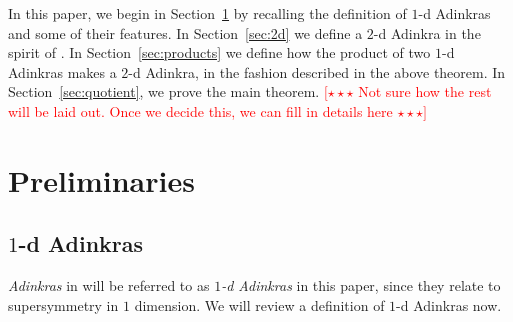\documentclass[12pt,twoside,singlespace]{article}
\numberwithin{equation}{section}
\theoremstyle{definition}
\newcommand{\com}[1]{\textcolor{red}{$[\star \star \star$ #1 $\star \star \star]$}}
\begin{document}
In this paper, we begin in Section~\ref{sec:prelim} by recalling the definition of $1$-d Adinkras and some of their features.  In Section~\ref{sec:2d} we define a $2$-d Adinkra in the spirit of \cite{gates:dimensional_extension,hubsch:weaving}.  In Section~\ref{sec:products} we define how the product of two $1$-d Adinkras makes a $2$-d Adinkra, in the fashion described in the above theorem.  In Section~\ref{sec:quotient}, we prove the main theorem.
\com{Not sure how the rest will be laid out.  Once we decide this, we can fill in details here}

\section{Preliminaries}
\label{sec:prelim}

\subsection{$1$-d Adinkras}
\label{sec:1d}
\emph{Adinkras} in \cite{d2l:first,d2l:graph-theoretic,zhang:adinkras} will be referred to as \emph{$1$-d Adinkras} in this paper, since they relate to supersymmetry in $1$ dimension.  We will review a definition of $1$-d Adinkras now.
\end{document}
